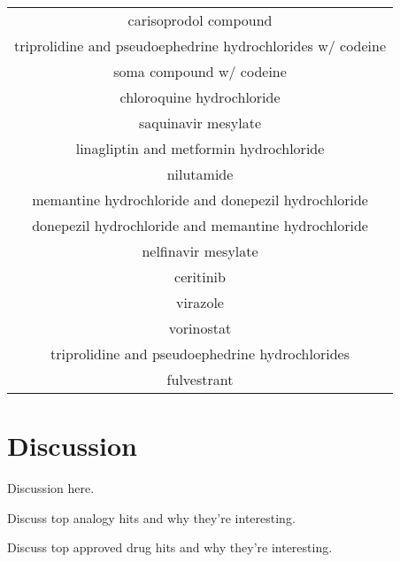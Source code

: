\documentclass{article}
\newcommand{\lgc}[1]{\cellcolor[gray]{0.85}#1}
\begin{document}
\begin{table}[ht]
\begin{tabular}[t]{c}
carisoprodol compound \\
triprolidine and pseudoephedrine hydrochlorides w/ codeine \\
soma compound w/ codeine \\
\lgc{chloroquine hydrochloride} \\
saquinavir mesylate \\
linagliptin and metformin hydrochloride \\
nilutamide \\
memantine hydrochloride and donepezil hydrochloride \\
donepezil hydrochloride and memantine hydrochloride \\
nelfinavir mesylate \\
ceritinib \\
virazole \\
vorinostat \\
triprolidine and pseudoephedrine hydrochlorides \\
fulvestrant \\
\hline
\end{tabular}
\end{table}

\section{Discussion}

Discussion here.

Discuss top analogy hits and why they're interesting.

Discuss top approved drug hits and why they're interesting.



\end{document}
